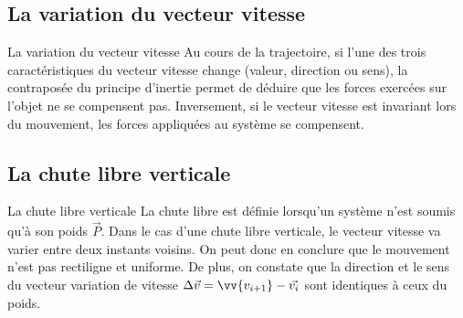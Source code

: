 \documentclass{beamer}
\begin{document}
\subsection{La variation du vecteur vitesse}
\begin{frame}{La variation du vecteur vitesse}
            Au cours de la trajectoire, si l’une des trois caractéristiques du vecteur vitesse change (valeur, direction ou sens), la contraposée du principe d’inertie permet de déduire que les forces exercées sur l’objet ne se compensent pas. Inversement, si le vecteur vitesse est invariant lors du mouvement, les forces appliquées au système se compensent.
\end{frame}

\subsection{La chute libre verticale}
\begin{frame}{La chute libre verticale}
        La chute libre est définie lorsqu’un système n’est soumis qu’à son poids $\vec{P}$.
        Dans le cas d’une chute libre verticale, le vecteur vitesse va varier entre deux instants voisins. On peut donc en conclure que le mouvement n’est pas rectiligne et uniforme. De plus, on constate que la direction et le sens du vecteur variation de vitesse $\Delta \vec{v}= \vv{v_{i+1}} - \vec{v_{i}}$ sont identiques à ceux du poids.
\end{frame}
\end{document}
